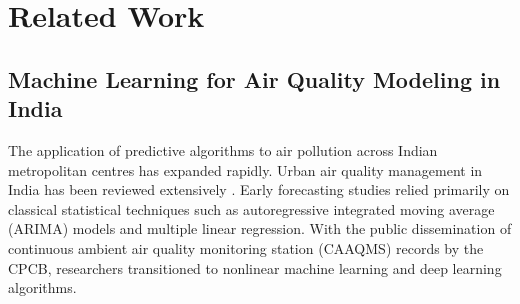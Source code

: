 \section{Related Work}
\label{sec:related}

\subsection{Machine Learning for Air Quality Modeling in India}
The application of predictive algorithms to air pollution across Indian metropolitan centres has expanded rapidly. Urban air quality management in India has been reviewed extensively \cite{gulia2015}. Early forecasting studies relied primarily on classical statistical techniques such as autoregressive integrated moving average (ARIMA) models and multiple linear regression. With the public dissemination of continuous ambient air quality monitoring station (CAAQMS) records by the CPCB, researchers transitioned to nonlinear machine learning and deep learning algorithms.

